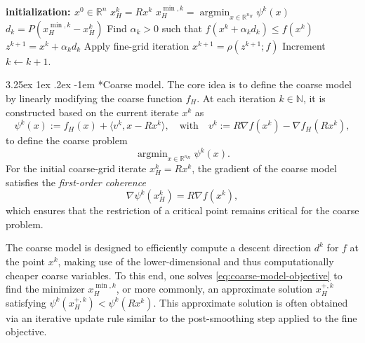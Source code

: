 \documentclass[11pt,reqno]{amsart}
\makeatletter
\numberwithin{equation}{section}
\numberwithin{figure}{section}
\theoremstyle{plain}
\theoremstyle{definition}
\newcommand{\N}{\mathbb{N}}
\newcommand{\R}{\mathbb{R}}
\newcommand{\la}{\langle}
\newcommand{\ra}{\rangle}
\newcommand{\df}{\nabla f}
\DeclareMathOperator*{\argmin}{arg min}
\renewcommand\paragraph{\@startsection{paragraph}{4}{0pt}%
  {3.25ex \@plus 1ex \@minus .2ex}%
  {-1em}
  {\normalfont\itshape}*}
\makeatother
\begin{document}
\begin{algorithm}[H]
        \caption{Two level optimization}\label{alg:Two-level-algorithm}
        \DontPrintSemicolon
        \textbf{initialization: $x^0 \in \R^n$}\;
         {
           {
            $x_H^k = Rx^k$ \;
            $x_H^{\min, k} = \argmin_{x \in \R^{n_H}} \psi^k(x)$ 
            $d_k = P(x^{\min, k}_H - x_H^k)$ 
            Find $\alpha_k > 0$ such that $f(x^k + \alpha_k d_k) \leq f(x^k)$ 
            $z^{k+1} = x^k + \alpha_k d_k$  
            Apply fine-grid iteration $x^{k+1} = \rho(z^{k+1}; f)$ 
          }
          Increment $k \leftarrow k+1$.
          }
    \end{algorithm}

\paragraph{Coarse model.}
The core idea is to define the coarse model by linearly modifying the coarse function $f_H$. At each iteration $k \in \N$, it is constructed based on the current iterate $x^k$ as
\begin{equation} \label{eq:k-th-coarse-function}
    \psi^k(x) := f_H(x) + \la v^k, x - Rx^k \ra, \quad \text{with} \quad  v^k := R \df(x^k) - \df_H(Rx^k),
\end{equation}
to define the coarse problem
\begin{equation} \label{eq:coarse-model-objective}
    \argmin_{x \in \R^{n_H}} \psi^k(x).
\end{equation}
For the initial coarse-grid iterate $x_H^k = Rx^k$, the gradient of the coarse model satisfies the \emph{first-order coherence}
\begin{equation} \label{eq:first-order-coherency}
    \nabla \psi^k(x_H^k) = R\df(x^k),
\end{equation}
which ensures that the restriction of a critical point remains critical for the coarse problem.

The coarse model is designed to efficiently compute a descent direction $d^k$ for $f$ at the point $x^k$, making use of the lower-dimensional and thus computationally cheaper coarse variables. To this end, one solves \eqref{eq:coarse-model-objective} to find the minimizer $x_H^{\min,k}$, or more commonly, an approximate solution $x_H^{+,k}$ satisfying $\psi^k(x_H^{+,k}) < \psi^k(Rx^k)$. This approximate solution is often obtained via an iterative update rule similar to the post-smoothing step applied to the fine objective.
\end{document}
